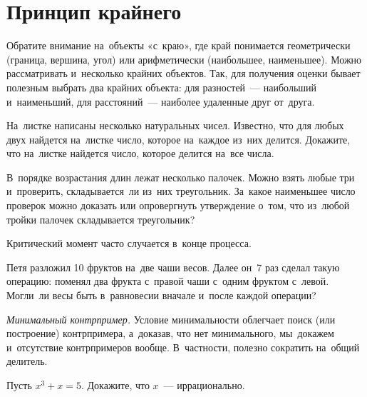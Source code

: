 
\section*{Принцип крайнего}



Обратите внимание на~объекты «с~краю», где край понимается геометрически
(граница, вершина, угол) или арифметически (наибольшее, наименьшее).
Можно рассматривать и~несколько крайних объектов.
Так, для получения оценки бывает полезным выбрать два крайних объекта: для
разностей~— наибольший и~наименьший, для расстояний~— наиболее удаленные
друг от~друга.

\begin{problems}

\item
На~листке написаны несколько натуральных чисел.
Известно, что для любых двух найдется на~листке число, которое на~каждое из~них
делится.
Докажите, что на~листке найдется число, которое делится на~все числа.

\item
В~порядке возрастания длин лежат несколько палочек.
Можно взять любые три и~проверить, складывается~ли из~них треугольник.
За~какое наименьшее число проверок можно доказать или опровергнуть утверждение
о~том, что из~любой тройки палочек складывается треугольник?

\end{problems}

Критический момент часто случается в~конце процесса.

\begin{problems}

\item
Петя разложил 10 фруктов на~две чаши весов.
Далее он~7 раз сделал такую операцию: поменял два фрукта с~правой чаши с~одним
фруктом с~левой.
Могли~ли весы быть в~равновесии вначале и~после каждой операции?

\end{problems}

\emph{Минимальный контрпример.}
Условие минимальности облегчает поиск (или построение) контрпримера, а~доказав,
что нет минимального, мы~докажем и~отсутствие контрпримеров вообще.
В~частности, полезно сократить на~общий делитель.

\begin{problems}

\item
Пусть $x^3 + x = 5$.
Докажите, что $x$~— иррационально.

\end{problems}

